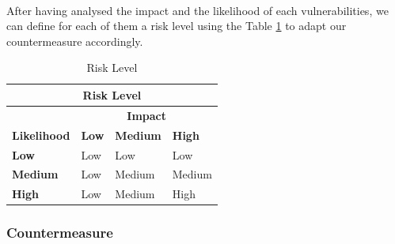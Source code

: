 \documentclass[a4paper,10pt]{article}
\begin{document}
\paragraph{} After having analysed the impact and the likelihood of each vulnerabilities, we can define for each of them a risk level using the Table \ref{table:RL} to adapt our countermeasure accordingly.

\begin{table}[!h]
	\centering
	\begin{tabular}{|l|l|l|l|}
		\hline
		\multicolumn{4}{|c|}{\textbf{Risk Level}} \\
		\hline
		 & \multicolumn{3}{|c|}{\textbf{Impact}}  \\ \hline
		\textbf{Likelihood} & \textbf{Low} & \textbf{Medium} & \textbf{High} \\ \hline
		\textbf{Low}& Low & Low & Low \\ \hline
		\textbf{Medium} & Low & Medium & Medium \\ \hline
		\textbf{High} & Low & Medium & High \\ \hline
	\end{tabular}
	\caption{Risk Level}
	\label{table:RL}
\end{table}

\subsubsection{Countermeasure}
\end{document}
